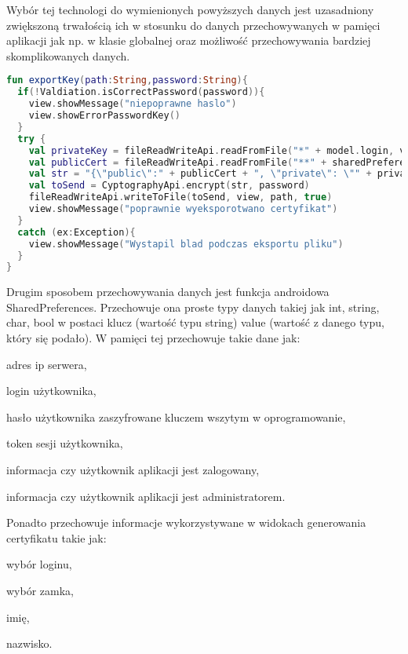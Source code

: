 	Wybór  tej technologi do wymienionych powyższych danych jest uzasadniony zwiększoną trwałością ich w stosunku do danych przechowywanych w pamięci aplikacji jak np.  w klasie globalnej oraz możliwość przechowywania bardziej skomplikowanych danych.
	
	\begin{lstlisting}[caption={Funkcja eksportująca klucz szyfrujący.}, label={lst:kod1}, language=Kotlin]
fun exportKey(path:String,password:String){
  if(!Valdiation.isCorrectPassword(password)){
    view.showMessage("niepoprawne haslo")
    view.showErrorPasswordKey()
  }
  try {
    val privateKey = fileReadWriteApi.readFromFile("*" + model.login, view)
    val publicCert = fileReadWriteApi.readFromFile("**" + sharedPreferenceApi.getString(view, EnumChoice.login), view)	
    val str = "{\"public\":" + publicCert + ", \"private\": \"" + privateKey + "\"}"
    val toSend = CyptographyApi.encrypt(str, password)
    fileReadWriteApi.writeToFile(toSend, view, path, true)
    view.showMessage("poprawnie wyeksporotwano certyfikat")
  }
  catch (ex:Exception){
    view.showMessage("Wystapil blad podczas eksportu pliku")
  }
}
	\end{lstlisting}	
		
	Drugim sposobem przechowywania danych jest funkcja androidowa SharedPreferences. Przechowuje ona proste typy danych takiej jak int, string, char, bool w postaci klucz (wartość typu string) value (wartość z danego typu, który się podało). W pamięci tej przechowuje takie dane jak:
	\begin{itemize*}
		\item adres ip serwera,
		\item login użytkownika,
		\item hasło użytkownika zaszyfrowane kluczem wszytym w oprogramowanie,
		\item token sesji użytkownika,
		\item informacja czy użytkownik aplikacji jest zalogowany,
		\item informacja czy użytkownik aplikacji jest administratorem.	
	\end{itemize*}

	Ponadto przechowuje informacje wykorzystywane w widokach generowania certyfikatu takie jak:
	\begin{itemize*}
		\item wybór loginu,
		\item wybór zamka,
		\item imię, 
		\item nazwisko.
	\end{itemize*}	

